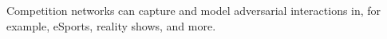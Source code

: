 \documentclass[preview]{standalone}
\begin{document}
Competition networks can capture and model adversarial interactions in, for example, eSports, reality shows, and more.\\
\end{document}
